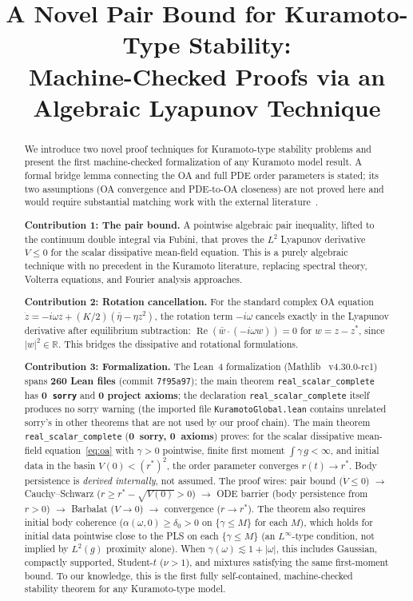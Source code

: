 \documentclass[11pt,a4paper]{article}
\title{A Novel Pair Bound for Kuramoto-Type Stability:\\
Machine-Checked Proofs via an Algebraic Lyapunov Technique}
\author{}
\date{}
\theoremstyle{definition}
\DeclareMathOperator{\re}{Re}
\newcommand{\R}{\mathbb{R}}
\begin{document}
\maketitle

\begin{abstract}
We introduce two novel proof techniques for Kuramoto-type stability problems and present the first machine-checked formalization of any Kuramoto model result. A formal bridge lemma connecting the OA and full PDE order parameters is stated; its two assumptions (OA convergence and PDE-to-OA closeness) are not proved here and would require substantial matching work with the external literature~\cite{dietert2017,dietert-fernandez2018}.

\textbf{Contribution 1: The pair bound.} A pointwise algebraic pair inequality, lifted to the continuum double integral via Fubini, that proves the $L^2$ Lyapunov derivative $\dot V \leq 0$ for the scalar dissipative mean-field equation. This is a purely algebraic technique with no precedent in the Kuramoto literature, replacing spectral theory, Volterra equations, and Fourier analysis approaches.

\textbf{Contribution 2: Rotation cancellation.} For the standard complex OA equation $\dot z = -i\omega z + (K/2)(\bar\eta - \eta z^2)$, the rotation term $-i\omega$ cancels exactly in the Lyapunov derivative after equilibrium subtraction: $\re(\bar w \cdot (-i\omega w)) = 0$ for $w = z - z^*$, since $|w|^2 \in \R$. This bridges the dissipative and rotational formulations.

\textbf{Contribution 3: Formalization.} The Lean~4 formalization (Mathlib~\cite{mathlib} v4.30.0-rc1) spans \textbf{260 Lean files} (commit \texttt{7f95a97}); the main theorem \texttt{real\_scalar\_complete} has \textbf{0~\texttt{sorry}} and \textbf{0 project axioms}; the declaration \texttt{real\_scalar\_complete} itself produces no sorry warning (the imported file \texttt{KuramotoGlobal.lean} contains unrelated sorry's in other theorems that are not used by our proof chain). The main theorem \texttt{real\_scalar\_complete} (\textbf{0~sorry, 0~axioms}) proves: for the scalar dissipative mean-field equation~\eqref{eq:oa} with $\gamma > 0$ pointwise, finite first moment $\int\gamma\,g < \infty$, and initial data in the basin $V(0) < (r^*)^2$, the order parameter converges $r(t) \to r^*$. Body persistence is \emph{derived internally}, not assumed. The proof wires: pair bound ($\dot V \leq 0$) $\to$ Cauchy--Schwarz ($r \geq r^* - \sqrt{V(0)} > 0$) $\to$ ODE barrier (body persistence from $r > 0$) $\to$ Barbalat ($V \to 0$) $\to$ convergence ($r \to r^*$). The theorem also requires initial body coherence ($\alpha(\omega,0) \geq \delta_0 > 0$ on $\{\gamma \leq M\}$ for each $M$), which holds for initial data pointwise close to the PLS on each $\{\gamma \leq M\}$ (an $L^\infty$-type condition, not implied by $L^2(g)$ proximity alone). When $\gamma(\omega) \lesssim 1 + |\omega|$, this includes Gaussian, compactly supported, Student-$t$ ($\nu > 1$), and mixtures satisfying the same first-moment bound. To our knowledge, this is the first fully self-contained, machine-checked stability theorem for any Kuramoto-type model.
\end{abstract}
\end{document}

